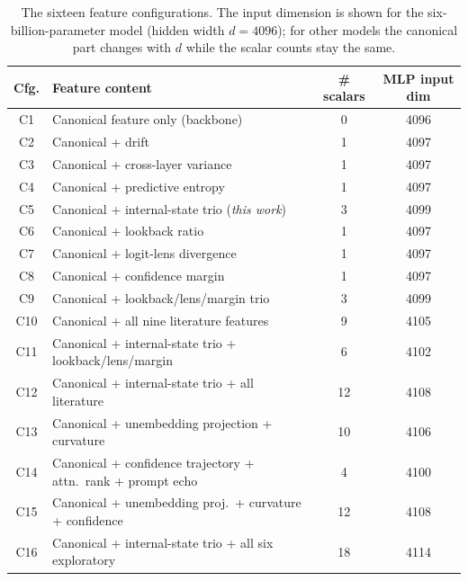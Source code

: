 \begin{table}[t]
\centering
\caption{The sixteen feature configurations. The input dimension is shown for the
six-billion-parameter model (hidden width $d=4096$); for other models the canonical part
changes with $d$ while the scalar counts stay the same.}
\label{tab:configs}
\small
\renewcommand{\arraystretch}{1.15}
\begin{tabular}{cl c c}
\toprule
\textbf{Cfg.} & \textbf{Feature content} & \textbf{\# scalars} & \textbf{MLP input dim} \\
\midrule
C1  & Canonical feature only (backbone)                         & 0  & 4096 \\
C2  & Canonical + drift                                         & 1  & 4097 \\
C3  & Canonical + cross-layer variance                          & 1  & 4097 \\
C4  & Canonical + predictive entropy                            & 1  & 4097 \\
C5  & Canonical + internal-state trio (\emph{this work})        & 3  & 4099 \\
C6  & Canonical + lookback ratio                                & 1  & 4097 \\
C7  & Canonical + logit-lens divergence                         & 1  & 4097 \\
C8  & Canonical + confidence margin                             & 1  & 4097 \\
C9  & Canonical + lookback/lens/margin trio                     & 3  & 4099 \\
C10 & Canonical + all nine literature features                  & 9  & 4105 \\
C11 & Canonical + internal-state trio + lookback/lens/margin     & 6  & 4102 \\
C12 & Canonical + internal-state trio + all literature           & 12 & 4108 \\
C13 & Canonical + unembedding projection + curvature           & 10 & 4106 \\
C14 & Canonical + confidence trajectory + attn.\ rank + prompt echo & 4 & 4100 \\
C15 & Canonical + unembedding proj.\ + curvature + confidence    & 12 & 4108 \\
C16 & Canonical + internal-state trio + all six exploratory      & 18 & 4114 \\
\bottomrule
\end{tabular}
\end{table}

